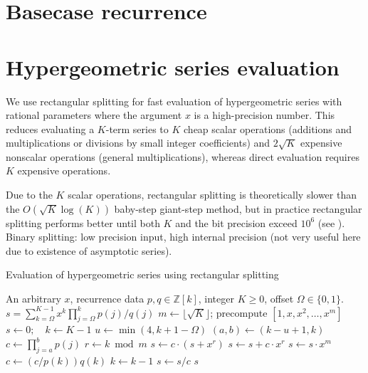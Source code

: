 \documentclass[11pt,a4paper]{article}
\begin{document}
\section{Basecase recurrence}

\label{sec:recurrence}

\section{Hypergeometric series evaluation}

\label{sec:serieseval}

We use rectangular splitting for fast evaluation of
hypergeometric series with
rational parameters where the argument $x$ is a high-precision number.
This reduces evaluating a $K$-term series to
$K$ cheap scalar operations (additions and multiplications or divisions
by small integer coefficients)
and $2\sqrt{K}$ expensive nonscalar operations (general multiplications),
whereas direct evaluation requires $K$ expensive operations.

Due to the $K$ scalar operations,
rectangular splitting is theoretically slower
than the $O(\sqrt{K} \log(K))$ baby-step giant-step method,
but in practice rectangular splitting
performs better until both $K$ and the bit precision
exceed $10^6$ (see \cite{Johansson2014rectangular}).
Binary splitting: low precision input, high internal precision
(not very useful here due to existence of asymptotic series).

\begin{algorithm}[h!]
  \caption{Evaluation of hypergeometric series using rectangular splitting}
  \small
  \label{alg:hyprs}
  \begin{algorithmic}[1]
    \Require An arbitrary $x$, recurrence data $p, q \in \mathbb{Z}[k]$, integer $K \ge 0$, offset $\Omega \in \{0,1\}$.
    \Ensure $s = \sum_{k=\Omega}^{K-1} x^k \prod_{j=\Omega}^k p(j) / q(j)$
    \State $m \gets \lfloor \sqrt K \rfloor$; precompute $[1, x, x^2, \ldots, x^m]$ 
    \State $s \gets 0; \quad k \gets K - 1$
        \State $u \gets \min(4, k + 1 - \Omega)$  
        \State $(a, b) \gets (k - u + 1, k)$  
        \State $c \gets \prod_{j=a}^b p(j)$ 
            \State $r \gets k \bmod m$
                \State $s \gets c \cdot (s + x^r)$ 
            \Else
                \State $s \gets s + c \cdot x^r$ 
            \EndIf
                \State $s \gets s \cdot x^m$ 
            \EndIf
            \State $c \gets (c / p(k)) q(k)$ 
            \State $k \gets k - 1$
        \EndWhile
        \State $s \gets s / c$
    \EndWhile
    \State \Return $s$
  \end{algorithmic}
\end{algorithm}
\end{document}
